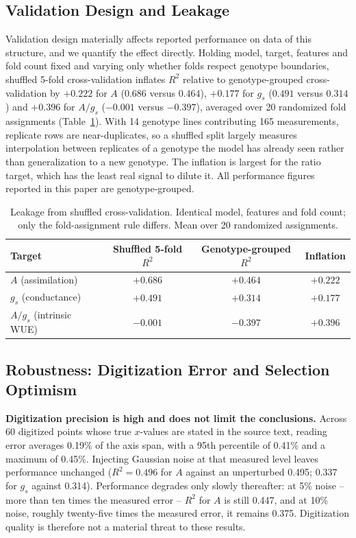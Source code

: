 \documentclass[runningheads]{llncs}
\begin{document}
\subsection{Validation Design and Leakage}\label{sec:leakage}

Validation design materially affects reported performance on data of this structure, and we quantify the effect directly. Holding model, target, features and fold count fixed and varying only whether folds respect genotype boundaries, shuffled 5-fold cross-validation inflates $R^{2}$ relative to genotype-grouped cross-validation by $+0.222$ for $A$ ($0.686$ versus $0.464$), $+0.177$ for $g_s$ ($0.491$ versus $0.314$) and $+0.396$ for $A/g_s$ ($-0.001$ versus $-0.397$), averaged over 20 randomized fold assignments (Table~\ref{tab5}). With 14 genotype lines contributing 165 measurements, replicate rows are near-duplicates, so a shuffled split largely measures interpolation between replicates of a genotype the model has already seen rather than generalization to a new genotype. The inflation is largest for the ratio target, which has the least real signal to dilute it. All performance figures reported in this paper are genotype-grouped.

\begin{table}
\caption{Leakage from shuffled cross-validation. Identical model, features and fold count; only the fold-assignment rule differs. Mean over 20 randomized assignments.}\label{tab5}
\centering
\small
\begin{tabular}{lccc}
\toprule
\textbf{Target} & \textbf{Shuffled 5-fold $R^{2}$} & \textbf{Genotype-grouped $R^{2}$} & \textbf{Inflation} \\
\midrule
$A$ (assimilation) & $+0.686$ & $+0.464$ & $+0.222$ \\
$g_s$ (conductance) & $+0.491$ & $+0.314$ & $+0.177$ \\
$A/g_s$ (intrinsic WUE) & $-0.001$ & $-0.397$ & $+0.396$ \\
\bottomrule
\end{tabular}
\end{table}

\subsection{Robustness: Digitization Error and Selection Optimism}\label{sec:robustnessresults}

\textbf{Digitization precision is high and does not limit the conclusions.} Across 60 digitized points whose true $x$-values are stated in the source text, reading error averages 0.19\% of the axis span, with a 95th percentile of 0.41\% and a maximum of 0.45\%. Injecting Gaussian noise at that measured level leaves performance unchanged ($R^{2}=0.496$ for $A$ against an unperturbed 0.495; $0.337$ for $g_s$ against 0.314). Performance degrades only slowly thereafter: at 5\% noise -- more than ten times the measured error -- $R^{2}$ for $A$ is still 0.447, and at 10\% noise, roughly twenty-five times the measured error, it remains 0.375. Digitization quality is therefore not a material threat to these results.
\end{document}
